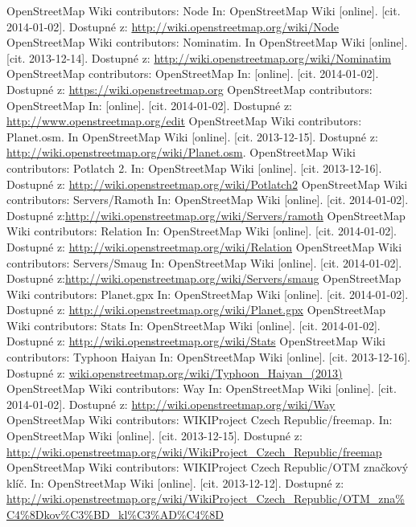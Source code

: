 \documentclass[11pt,a4paper,titlepage,oneside]{book}
\begin{document}
\begin{thebibliography}{99}
	OpenStreetMap Wiki contributors: Node In: OpenStreetMap Wiki [online]. [cit. 2014-01-02]. Dostupné z: \url{http://wiki.openstreetmap.org/wiki/Node}
	OpenStreetMap Wiki contributors: Nominatim. In OpenStreetMap Wiki [online]. [cit. 2013-12-14]. Dostupné z: \url{http://wiki.openstreetmap.org/wiki/Nominatim}	
	OpenStreetMap contributors: OpenStreetMap In:  [online]. [cit. 2014-01-02]. Dostupné z:	\url{https://wiki.openstreetmap.org}
	OpenStreetMap contributors: OpenStreetMap In:  [online]. [cit. 2014-01-02]. Dostupné z:	\url{http://www.openstreetmap.org/edit}
	OpenStreetMap Wiki contributors: Planet.osm. In OpenStreetMap Wiki [online]. [cit. 2013-12-15]. Dostupné z: \url{http://wiki.openstreetmap.org/wiki/Planet.osm}.
	OpenStreetMap Wiki contributors: Potlatch 2. In: OpenStreetMap Wiki [online]. [cit. 2013-12-16]. Dostupné z:  \url{http://wiki.openstreetmap.org/wiki/Potlatch2}
	OpenStreetMap Wiki contributors: Servers/Ramoth In: OpenStreetMap Wiki [online]. [cit. 2014-01-02]. Dostupné z:\url{http://wiki.openstreetmap.org/wiki/Servers/ramoth}
	OpenStreetMap Wiki contributors: Relation In: OpenStreetMap Wiki [online]. [cit. 2014-01-02]. Dostupné z: \url{http://wiki.openstreetmap.org/wiki/Relation}
	OpenStreetMap Wiki contributors: Servers/Smaug In: OpenStreetMap Wiki [online]. [cit. 2014-01-02]. Dostupné z:\url{http://wiki.openstreetmap.org/wiki/Servers/smaug}
	OpenStreetMap Wiki contributors: Planet.gpx In: OpenStreetMap Wiki [online]. [cit. 2014-01-02]. Dostupné z: \url{http://wiki.openstreetmap.org/wiki/Planet.gpx}
	OpenStreetMap Wiki contributors: Stats In: OpenStreetMap Wiki [online]. [cit. 2014-01-02]. Dostupné z: \url{http://wiki.openstreetmap.org/wiki/Stats}
	OpenStreetMap Wiki contributors: Typhoon Haiyan In: OpenStreetMap Wiki [online]. [cit. 2013-12-16]. Dostupné z: \url{wiki.openstreetmap.org/wiki/Typhoon_Haiyan_(2013)}
	OpenStreetMap Wiki contributors: Way In: OpenStreetMap Wiki [online]. [cit. 2014-01-02]. Dostupné z: \url{http://wiki.openstreetmap.org/wiki/Way}
	OpenStreetMap Wiki contributors: WIKIProject Czech Republic/freemap. In: OpenStreetMap Wiki [online]. [cit. 2013-12-15]. Dostupné z:  \url{http://wiki.openstreetmap.org/wiki/WikiProject_Czech_Republic/freemap}
	 OpenStreetMap Wiki contributors: WIKIProject Czech Republic/OTM značkový klíč. In: OpenStreetMap Wiki [online]. [cit. 2013-12-12]. Dostupné z: 	\url{http://wiki.openstreetmap.org/wiki/WikiProject_Czech_Republic/OTM_zna%C4%8Dkov%C3%BD_kl%C3%AD%C4%8D}

\end{thebibliography}
\end{document}

